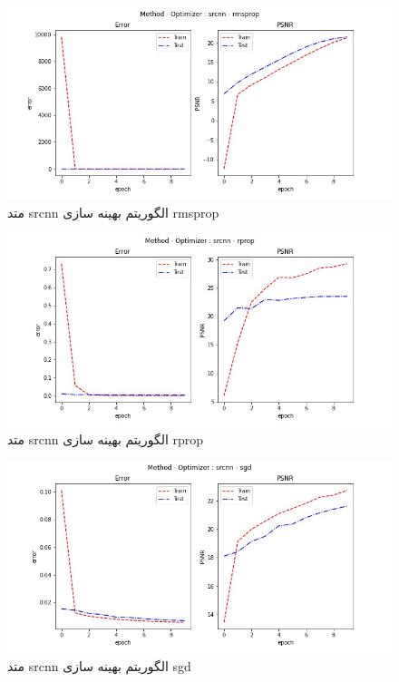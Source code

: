  \begin{figure}[!h] 
       \centering 
       \includegraphics[width=160mm]{./chapter3/images/error-psnr-srcnn-rmsprop.jpg}
       \caption{متد srcnn الگوریتم بهینه سازی rmsprop}
       \label{fig:error-psnr-srcnn-rmsprop}
 \end{figure}
 \begin{figure}[!h] 
       \centering 
       \includegraphics[width=160mm]{./chapter3/images/error-psnr-srcnn-rprop.jpg}
       \caption{متد srcnn الگوریتم بهینه سازی rprop}
       \label{fig:error-psnr-srcnn-rprop}
 \end{figure}
 \begin{figure}[!h] 
       \centering 
       \includegraphics[width=160mm]{./chapter3/images/error-psnr-srcnn-sgd.jpg}
       \caption{متد srcnn الگوریتم بهینه سازی sgd}
       \label{fig:error-psnr-srcnn-sgd}
 \end{figure}
